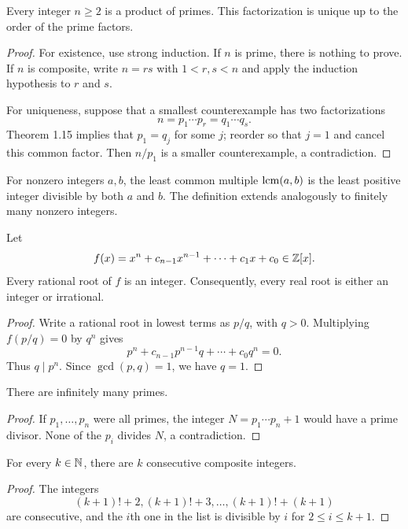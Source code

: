 \begin{thm}
Every integer $n\ge2$ is a product of primes.  This factorization is unique up to the order of the prime factors.
\end{thm}
\begin{proof}
For existence, use strong induction.  If $n$ is prime, there is nothing to prove.  If $n$ is composite, write $n=rs$ with $1<r,s<n$ and apply the induction hypothesis to $r$ and $s$.

For uniqueness, suppose that a smallest counterexample has two factorizations
\[
 n=p_1\cdots p_r=q_1\cdots q_s.
\]
Theorem 1.15 implies that $p_1=q_j$ for some $j$; reorder so that $j=1$ and cancel this common factor.  Then $n/p_1$ is a smaller counterexample, a contradiction.
\end{proof}

\begin{de}
For nonzero integers $a,b$, the least common multiple $\operatorname{lcm}(a,b)$ is the least positive integer divisible by both $a$ and $b$.  The definition extends analogously to finitely many nonzero integers.
\end{de}

\begin{thm}
Let
\[
 f(x)=x^n+c_{n-1}x^{n-1}+\cdots+c_1x+c_0\in\mathbb{Z}[x].
\]
Every rational root of $f$ is an integer.  Consequently, every real root is either an integer or irrational.
\end{thm}
\begin{proof}
Write a rational root in lowest terms as $p/q$, with $q>0$.  Multiplying $f(p/q)=0$ by $q^n$ gives
\[
 p^n+c_{n-1}p^{n-1}q+\cdots+c_0q^n=0.
\]
Thus $q\mid p^n$.  Since $\gcd(p,q)=1$, we have $q=1$.
\end{proof}

\begin{thm}
There are infinitely many primes.
\end{thm}
\begin{proof}
If $p_1,\ldots,p_n$ were all primes, the integer $N=p_1\cdots p_n+1$ would have a prime divisor.  None of the $p_i$ divides $N$, a contradiction.
\end{proof}

\begin{thm}
For every $k\in\mathbb{N}$, there are $k$ consecutive composite integers.
\end{thm}
\begin{proof}
The integers
\[
 (k+1)!+2,(k+1)!+3,\ldots,(k+1)!+(k+1)
\]
are consecutive, and the $i$th one in the list is divisible by $i$ for $2\le i\le k+1$.
\end{proof}
